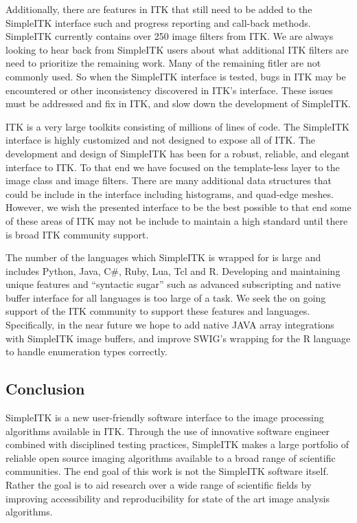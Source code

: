 \documentclass{frontiersMED} %
\begin{document}
Additionally, there are features in ITK that still need to be added to
the SimpleITK interface such and progress reporting and call-back
methods. SimpleITK currently contains over 250 image filters from
ITK. We are always looking to hear back from SimpleITK users about
what additional ITK filters are need to prioritize the remaining
work. Many of the remaining fitler are not commonly used. So when the
SimpleITK interface is tested, bugs in ITK may be encountered or other
inconsistency discovered in ITK’s interface. These issues must be
addressed and fix in ITK, and slow down the development of SimpleITK.

ITK is a very large toolkits consisting of millions of lines of
code. The SimpleITK interface is highly customized and not designed to
expose all of ITK. The development and design of SimpleITK has been
for a robust, reliable, and elegant interface to ITK. To that end we
have focused on the template-less layer to the image class and image
filters.  There are many additional data structures that could be
include in the interface including histograms, and quad-edge
meshes. However, we wish the presented interface to be the best
possible to that end some of these areas of ITK may not be include to
maintain a high standard until there is broad ITK community support.

The number of the languages which SimpleITK is wrapped for is large
and includes Python, Java, C\#, Ruby, Lua, Tcl and R. Developing and
maintaining unique features and “syntactic sugar” such as advanced
subscripting and native buffer interface for all languages is too
large of a task. We seek the on going support of the ITK community to
support these features and languages. Specifically, in the near future
we hope to add native JAVA array integrations with SimpleITK image
buffers, and improve SWIG’s wrapping for the R language to handle
enumeration types correctly.

\subsection{Conclusion}
SimpleITK is a new user-friendly software interface to the image
processing algorithms available in ITK. Through the use of innovative
software engineer combined with disciplined testing practices,
SimpleITK makes a large portfolio of reliable open source imaging
algorithms available to a broad range of scientific communities. The
end goal of this work is not the SimpleITK software itself. Rather the
goal is to aid research over a wide range of scientific fields by
improving accessibility and reproducibility for state of the art image
analysis algorithms.
\end{document}
